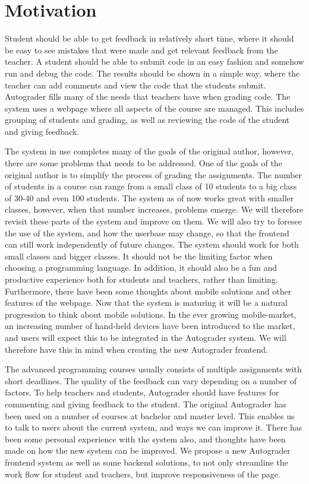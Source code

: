 \chapter*{Motivation}

Student should be able to get feedback in relatively short time, where it should be easy to see mistakes that were made and get relevant feedback from the teacher. A student should be able to submit code in an easy fashion and somehow run and debug the code. The results should be shown in a simple way, where the teacher can add comments and view the code that the students submit. Autograder fills many of the needs that teachers have when grading code. The system uses a webpage where all aspects of the course are managed. This includes grouping of students and grading, as well as reviewing the code of the student and giving feedback. 


The system in use completes many of the goals of the original author, however, there are some problems that needs to be addressed. One of the goals of the original author is to simplify the process of grading the assignments. The number of students in a course can range from a small class of 10 students to a big class of 30-40 and even 100 students. The system as of now works great with smaller classes, however, when that number increases, problems emerge. We will therefore revisit these parts of the system and improve on them. We will also try to foresee the use of the system, and how the userbase may change, so that the frontend can still work independently of future changes. The system should work for both small classes and bigger classes. It should not be the limiting factor when choosing a programming language. In addition, it should also be a fun and productive experience both for students and teachers, rather than limiting. Furthermore, there have been some thoughts about mobile solutions and other features of the webpage. Now that the system is maturing it will be a natural progression to think about mobile solutions. In the ever growing mobile-market, an increasing number of hand-held devices have been introduced to the market, and users will expect this to be integrated in the Autograder system. We will therefore have this in mind when creating the new Autograder frontend.

The advanced programming courses usually consists of multiple assignments with short deadlines. The quality of the feedback can vary depending on a number of factors. To help teachers and students, Autograder should have features for commenting and giving feedback to the student. The original Autograder has been used on a number of courses at bachelor and master level. This enables us to talk to users about the current system, and ways we can improve it. There has been some personal experience with the system also, and thoughts have been made on how the new system can be improved. We propose a new Autograder frontend system as well as some backend solutions, to not only streamline the work flow for student and teachers, but improve responsiveness of the page.
